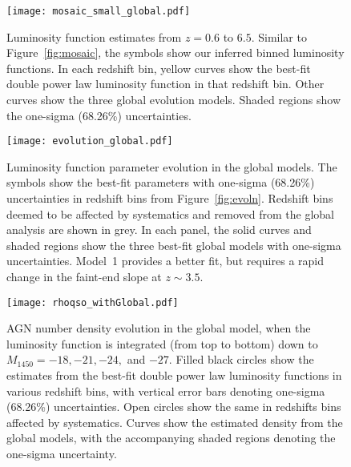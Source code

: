\documentclass[fleqn,usenatbib]{mnras}
\begin{document}
\begin{figure*}
  \begin{center}
    \texttt{[image: mosaic\_small\_global.pdf]}
  \end{center}
  \caption{Luminosity function estimates from $z=0.6$ to $6.5$.
    Similar to Figure~\ref{fig:mosaic}, the symbols show our inferred
    binned luminosity functions.  In each redshift bin, yellow curves
    show the best-fit double power law luminosity function in that
    redshift bin.  Other curves show the three global evolution
    models.  Shaded regions show the one-sigma (68.26\%)
    uncertainties.}
  \label{fig:mosaic_global}
\end{figure*}

\begin{figure*}
  \begin{center}
    \texttt{[image: evolution\_global.pdf]}
  \end{center}
  \caption{Luminosity function parameter evolution in the global
    models.  The symbols show the best-fit parameters with one-sigma
    (68.26\%) uncertainties in redshift bins from
    Figure~\ref{fig:evoln}.  Redshift bins deemed to be affected by
    systematics and removed from the global analysis are shown in
    grey.  In each panel, the solid curves and shaded regions show the
    three best-fit global models with one-sigma uncertainties.
    Model~1 provides a better fit, but requires a rapid change in the
    faint-end slope at $z\sim 3.5$.}
  \label{fig:evoln_global}
\end{figure*}

\begin{figure}
  \begin{center}
    \texttt{[image: rhoqso\_withGlobal.pdf]}
  \end{center}
  \caption{AGN number density evolution in the global model, when the
    luminosity function is integrated (from top to bottom) down to
    $M_\mathrm{1450}=-18, -21, -24,$ and $-27$.  Filled black circles
    show the estimates from the best-fit double power law luminosity
    functions in various redshift bins, with vertical error bars
    denoting one-sigma (68.26\%) uncertainties.  Open circles show the
    same in redshifts bins affected by systematics.  Curves show the
    estimated density from the global models, with the accompanying
    shaded regions denoting the one-sigma uncertainty. }
  \label{fig:rhoqso}
\end{figure}
\end{document}
